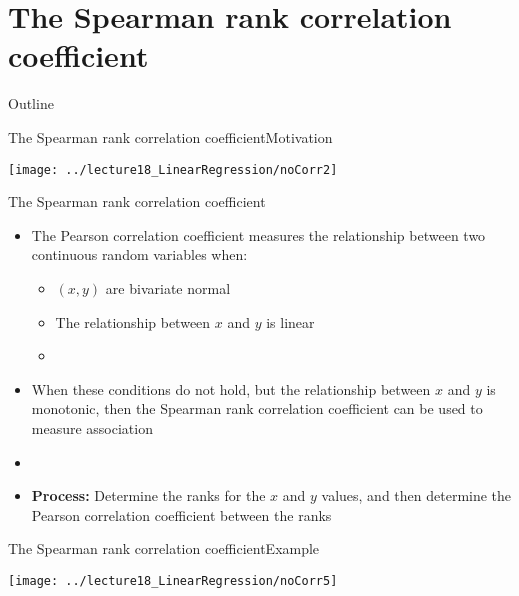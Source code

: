 \documentclass[xcolor=dvipsnames]{beamer}
\begin{document}
\section{The Spearman rank correlation coefficient}
\begin{frame}{Outline}
	\tableofcontents[currentsection,subsectionstyle=show/shaded/hide]
\end{frame}

\begin{frame}{The Spearman rank correlation coefficient}{Motivation}
	\begin{center}
		\texttt{[image: ../lecture18\_LinearRegression/noCorr2]}
	\end{center}
\end{frame}

\begin{frame}{The Spearman rank correlation coefficient}
	\begin{itemize}
		\item The Pearson correlation coefficient measures the relationship between two continuous random variables when: \pause
		\begin{itemize}
			\item $(x,y)$ are bivariate normal \pause
			\item The relationship between $x$ and $y$ is linear \pause
			\item[]
		\end{itemize}
		\item When these conditions do not hold, but the relationship between $x$ and $y$ is monotonic, then the Spearman rank correlation coefficient can be used to measure association \pause
		\item[]
		\item \textbf{Process:} Determine the ranks for the $x$ and $y$ values, and then determine the Pearson correlation coefficient between the ranks
	\end{itemize}
\end{frame}

\begin{frame}{The Spearman rank correlation coefficient}{Example}
	\begin{center}
		\texttt{[image: ../lecture18\_LinearRegression/noCorr5]}
	\end{center}
\end{frame}
\end{document}
